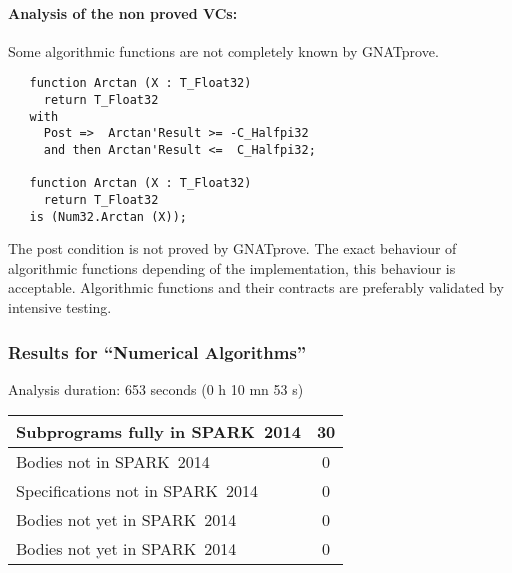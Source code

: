 \documentclass[10pt,a4paper,twocolumn]{article}
\newcommand{\gnatprove}{GNATprove\xspace}
\newcommand{\newspark}{SPARK~2014\xspace}
\begin{document}
\paragraph{Analysis of the non proved VCs:}
Some algorithmic functions are not completely known by \gnatprove.

\begin{lstlisting}
   function Arctan (X : T_Float32)
	 return T_Float32
   with
     Post =>  Arctan'Result >= -C_Halfpi32
     and then Arctan'Result <=  C_Halfpi32;

   function Arctan (X : T_Float32)
	 return T_Float32
   is (Num32.Arctan (X));
\end{lstlisting}

The post condition is not proved by \gnatprove.
The exact behaviour of algorithmic functions depending of the implementation, this behaviour is acceptable.
Algorithmic functions and their contracts are preferably validated by intensive testing.

\subsubsection{Results for ``Numerical Algorithms''}

Analysis duration: 653 seconds (0 h 10 mn 53 s)

\vspace{5mm}

\begin{tabular}{|l|c|}
\hline
Subprograms fully in \newspark  & 30  \\
\hline
Bodies not in \newspark         & 0   \\
\hline
Specifications not in \newspark & 0   \\
\hline
Bodies not yet in \newspark     & 0   \\
\hline
Bodies not yet in \newspark     & 0   \\
\hline
\end{tabular}

\vspace{5mm}
\end{document}
